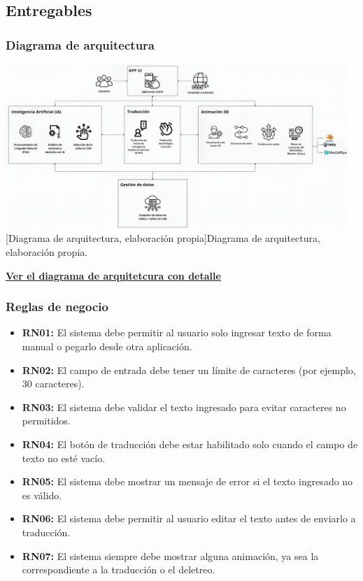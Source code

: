 \subsection{Entregables}

\subsubsection{Diagrama de arquitectura}
\begin{center}
	\includegraphics[width=0.97\textwidth]{Images/Cap 3/Arquitectura_Grande.jpg}
	[Diagrama de arquitectura, elaboración propia]{Diagrama de arquitectura, elaboración propia.}  %
\end{center}

 \begin{flushleft} \href{https://miro.com/app/board/uXjVI24dV0c=/?share_link_id=690276332577}{\textbf{Ver el diagrama de arquitetcura con detalle}} \end{flushleft}

\subsubsection{Reglas de negocio}
\begin{itemize}[leftmargin=1.5cm]
    \item \textbf{RN01:} El sistema debe permitir al usuario solo ingresar texto de forma manual o pegarlo desde otra aplicación.
    \item \textbf{RN02:} El campo de entrada debe tener un límite de caracteres (por ejemplo, 30 caracteres).
    \item \textbf{RN03:} El sistema debe validar el texto ingresado para evitar caracteres no permitidos.
    \item \textbf{RN04:} El botón de traducción debe estar habilitado solo cuando el campo de texto no esté vacío.
    \item \textbf{RN05:} El sistema debe mostrar un mensaje de error si el texto ingresado no es válido.
    \item \textbf{RN06:} El sistema debe permitir al usuario editar el texto antes de enviarlo a traducción.
	\item \textbf{RN07:} El sistema siempre debe mostrar alguna animación, ya sea la correspondiente a la traducción o el deletreo.
\end{itemize}
